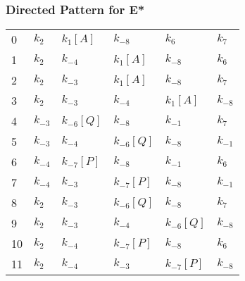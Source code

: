 \documentclass{article}%
\begin{document}
\subsubsection{Directed Pattern for E*}%
\label{ssubsec:Directed Pattern for E*}%
\begin{tabular}{llllll}
\toprule
0  &   $k_{2}$ &   $k_{1}$$[A]$ &       $k_{-8}$ &        $k_{6}$ &   $k_{7}$ \\
1  &   $k_{2}$ &       $k_{-4}$ &   $k_{1}$$[A]$ &       $k_{-8}$ &   $k_{6}$ \\
2  &   $k_{2}$ &       $k_{-3}$ &   $k_{1}$$[A]$ &       $k_{-8}$ &   $k_{7}$ \\
3  &   $k_{2}$ &       $k_{-3}$ &       $k_{-4}$ &   $k_{1}$$[A]$ &  $k_{-8}$ \\
4  &  $k_{-3}$ &  $k_{-6}$$[Q]$ &       $k_{-8}$ &       $k_{-1}$ &   $k_{7}$ \\
5  &  $k_{-3}$ &       $k_{-4}$ &  $k_{-6}$$[Q]$ &       $k_{-8}$ &  $k_{-1}$ \\
6  &  $k_{-4}$ &  $k_{-7}$$[P]$ &       $k_{-8}$ &       $k_{-1}$ &   $k_{6}$ \\
7  &  $k_{-4}$ &       $k_{-3}$ &  $k_{-7}$$[P]$ &       $k_{-8}$ &  $k_{-1}$ \\
8  &   $k_{2}$ &       $k_{-3}$ &  $k_{-6}$$[Q]$ &       $k_{-8}$ &   $k_{7}$ \\
9  &   $k_{2}$ &       $k_{-3}$ &       $k_{-4}$ &  $k_{-6}$$[Q]$ &  $k_{-8}$ \\
10 &   $k_{2}$ &       $k_{-4}$ &  $k_{-7}$$[P]$ &       $k_{-8}$ &   $k_{6}$ \\
11 &   $k_{2}$ &       $k_{-4}$ &       $k_{-3}$ &  $k_{-7}$$[P]$ &  $k_{-8}$ \\
\bottomrule
\end{tabular}

%
\end{document}
